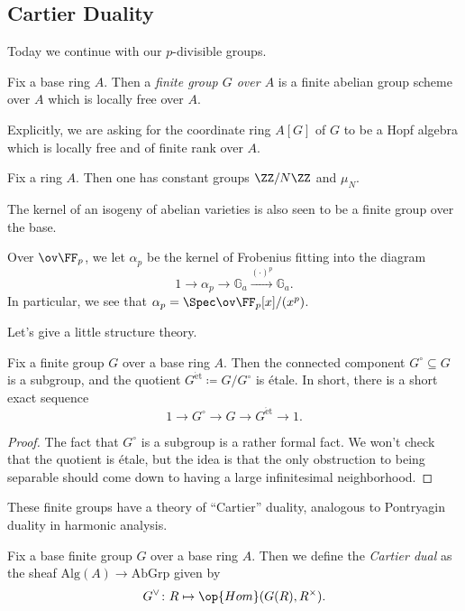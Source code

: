 \documentclass[../notes.tex]{subfiles}
\begin{document}
\subsection{Cartier Duality}
Today we continue with our $p$-divisible groups.
\begin{definition}
	Fix a base ring $A$. Then a \textit{finite group $G$ over $A$} is a finite abelian group scheme over $A$ which is locally free over $A$.
\end{definition}
\begin{remark}
	Explicitly, we are asking for the coordinate ring $A[G]$ of $G$ to be a Hopf algebra which is locally free and of finite rank over $A$.
\end{remark}
\begin{example}
	Fix a ring $A$. Then one has constant groups ${\ZZ/N\ZZ}$ and ${\mu_N}$.
\end{example}
\begin{example}
	The kernel of an isogeny of abelian varieties is also seen to be a finite group over the base.
\end{example}
\begin{example}
	Over $\ov\FF_p$, we let $\alpha_p$ be the kernel of Frobenius fitting into the diagram
	\[1\to\alpha_p\to\mathbb G_a\stackrel{(\cdot)^p}\to\mathbb G_a.\]
	In particular, we see that $\alpha_p=\Spec\ov\FF_p[x]/(x^p)$.
\end{example}
Let's give a little structure theory.
\begin{lemma} \label{lem:conn-et-sequence}
	Fix a finite group $G$ over a base ring $A$. Then the connected component $G^\circ\subseteq G$ is a subgroup, and the quotient $G^{\mathrm{\acute et}}\coloneqq G/G^\circ$ is \'etale. In short, there is a short exact sequence
	\[1\to G^\circ\to G\to G^{\mathrm{\acute et}}\to1.\]
\end{lemma}
\begin{proof}
	The fact that $G^\circ$ is a subgroup is a rather formal fact. We won't check that the quotient is \'etale, but the idea is that the only obstruction to being separable should come down to having a large infinitesimal neighborhood.
\end{proof}
These finite groups have a theory of ``Cartier'' duality, analogous to Pontryagin duality in harmonic analysis.
\begin{definition}
	Fix a base finite group $G$ over a base ring $A$. Then we define the \textit{Cartier dual} as the sheaf $\mathrm{Alg}(A)\to\mathrm{AbGrp}$ given by
	\[G^\lor\colon R\mapsto\op{Hom}(G(R),R^\times).\]
\end{definition}
\end{document}
